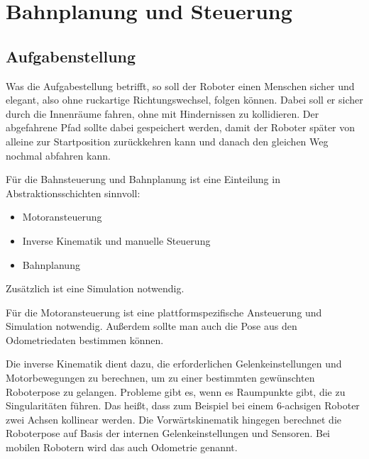 \chapter{Bahnplanung und Steuerung}
\label{bahnplanung_steuerung_cha}

\section{Aufgabenstellung}
\label{bahnplanung_aufgabenstellung_sec}
\authorsection{\editoroier}


Was die Aufgabestellung betrifft, so soll der Roboter einen Menschen sicher und elegant, also ohne ruckartige Richtungswechsel, folgen können.
Dabei soll er sicher durch die Innenräume fahren, ohne mit Hindernissen zu kollidieren.
Der abgefahrene Pfad sollte dabei gespeichert werden, damit der Roboter später von alleine zur Startposition zurückkehren kann und danach den gleichen Weg nochmal abfahren kann.

Für die Bahnsteuerung und Bahnplanung ist eine Einteilung in Abstraktionsschichten sinnvoll:
\begin{itemize}
	\item Motoransteuerung
	\item Inverse Kinematik und manuelle Steuerung
	\item Bahnplanung	
\end{itemize}
Zusätzlich ist eine Simulation notwendig.

Für die Motoransteuerung ist eine plattformspezifische Ansteuerung und Simulation notwendig.
Außerdem sollte man auch die Pose aus den Odometriedaten bestimmen können.

Die inverse Kinematik dient dazu, die erforderlichen Gelenkeinstellungen und Motorbewegungen zu berechnen, um zu einer bestimmten gewünschten Roboterpose zu gelangen.
Probleme gibt es, wenn es Raumpunkte gibt, die zu Singularitäten führen.
Das heißt, dass zum Beispiel bei einem 6-achsigen Roboter zwei Achsen kollinear werden.
Die Vorwärtskinematik hingegen berechnet die Roboterpose auf Basis der internen Gelenkeinstellungen und Sensoren.
Bei mobilen Robotern wird das auch Odometrie genannt.


